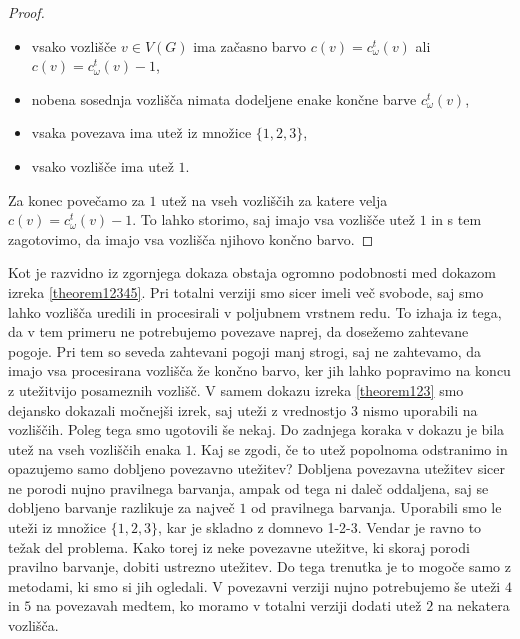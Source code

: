 \documentclass[12pt,a4paper,twoside]{article}
\theoremstyle{definition} %
\theoremstyle{plain} %
\numberwithin{equation}{section}  %
\begin{document}
\begin{proof}
\begin{itemize}
\item vsako vozlišče $v \in V(G)$ ima začasno barvo $c(v) = c_{\omega}^t(v)$ ali $c(v) = c_{\omega}^t(v) - 1$,
\item nobena sosednja vozlišča nimata dodeljene enake končne barve $c_{\omega}^t(v)$,
\item vsaka povezava ima utež iz množice $\{1,2,3\}$,
\item vsako vozlišče ima utež $1$.
\end{itemize}
Za konec povečamo za $1$ utež na vseh vozliščih za katere velja $c(v) = c_{\omega}^t(v) - 1$. To lahko storimo, saj imajo vsa vozlišče utež $1$ in s tem zagotovimo, da imajo vsa vozlišča njihovo končno barvo.

\end{proof}
Kot je razvidno iz zgornjega dokaza obstaja ogromno podobnosti med dokazom izreka \ref{theorem12345}. Pri totalni verziji smo sicer imeli več svobode, saj smo lahko vozlišča uredili in procesirali v poljubnem vrstnem redu. To izhaja iz tega, da v tem primeru ne potrebujemo povezave naprej, da dosežemo zahtevane pogoje. Pri tem so seveda zahtevani pogoji manj strogi, saj ne zahtevamo, da imajo vsa procesirana vozlišča že končno barvo, ker jih lahko popravimo na koncu z utežitvijo posameznih vozlišč. V samem dokazu izreka \ref{theorem123} smo dejansko dokazali močnejši izrek, saj uteži z vrednostjo $3$ nismo uporabili na vozliščih. Poleg tega smo ugotovili še nekaj. Do zadnjega koraka v dokazu je bila utež na vseh vozliščih enaka $1$. Kaj se zgodi, če to utež popolnoma odstranimo in opazujemo samo dobljeno povezavno utežitev? Dobljena povezavna utežitev sicer ne porodi nujno pravilnega barvanja, ampak od tega ni daleč oddaljena, saj se dobljeno barvanje razlikuje za največ $1$ od pravilnega barvanja. Uporabili smo le uteži iz množice $\{1,2,3\}$, kar je skladno z domnevo 1-2-3. Vendar je ravno to težak del problema. Kako torej iz neke povezavne utežitve, ki skoraj porodi pravilno barvanje, dobiti ustrezno utežitev. Do tega trenutka je to mogoče samo z metodami, ki smo si jih ogledali. V povezavni verziji nujno potrebujemo še uteži $4$ in $5$ na povezavah medtem, ko moramo v totalni verziji dodati utež $2$ na nekatera vozlišča.
\end{document}

